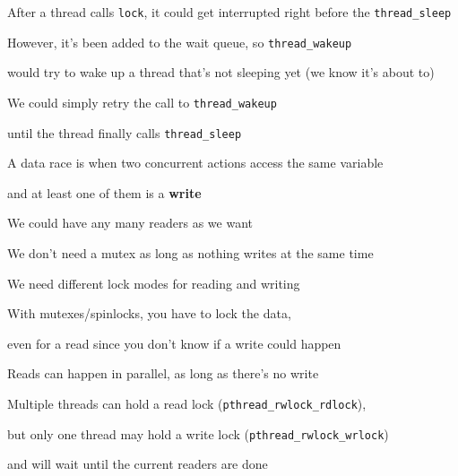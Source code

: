   \begin{slide}


    After a thread calls \texttt{lock}, it could get interrupted right before
    the \texttt{thread\_sleep}
    \medskip

    However, it's been added to the wait queue, so \texttt{thread\_wakeup}

    would try to wake up a thread that's not sleeping yet (we know it's about
    to)
    \medskip

    We could simply retry the call to \texttt{thread\_wakeup}

    until the thread finally calls \texttt{thread\_sleep}

  \end{slide}

  \begin{slide}


    A data race is when two concurrent actions access the same variable

    and at least one of them is a \textbf{write}
    \medskip

    We could have any many readers as we want

    \leftspace{}We don't need a mutex as long as nothing writes at the same
    time
    \medskip

    We need different lock modes for reading and writing

  \end{slide}

  \begin{slide}


    With mutexes/spinlocks, you have to lock the data,

    \leftspace{}even for a read since you don't know if a write could happen
    \medskip

    Reads can happen in parallel, as long as there's no write
    \medskip

    Multiple threads can hold a read lock ({\tt pthread\_rwlock\_rdlock}),

    \leftspace{}but only one thread may hold a write lock ({\tt pthread\_rwlock\_wrlock})

    \leftspace{}and will wait until the current readers are done

  \end{slide}

